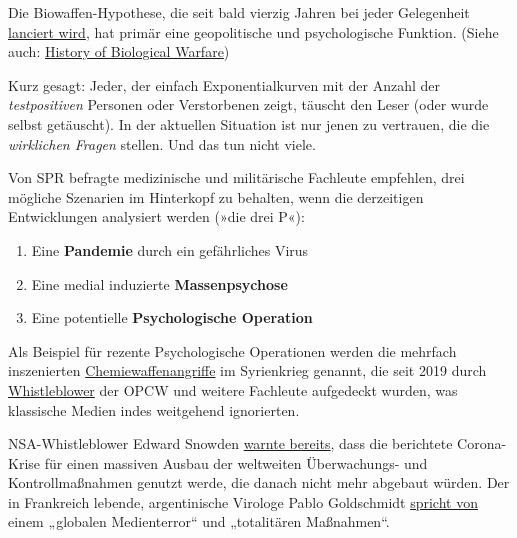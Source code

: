 Die Biowaffen-Hypothese, die seit bald vierzig Jahren bei jeder
Gelegenheit
\href{https://www.wilsoncenter.org/blog-post/operation-denver-kgb-and-stasi-disinformation-regarding-aids}{lanciert
wird}, hat primär eine geopolitische und psychologische Funktion. (Siehe
auch:
\href{https://www.emedicinehealth.com/biological_warfare/article_em.htm}{History
of Biological Warfare})

Kurz gesagt: Jeder, der einfach Exponentialkurven mit der Anzahl der
\emph{testpositiven} Personen oder Verstorbenen zeigt, täuscht den Leser
(oder wurde selbst getäuscht). In der aktuellen Situation ist nur jenen
zu vertrauen, die die \emph{wirklichen Fragen} stellen. Und das tun
nicht viele.

Von SPR befragte medizinische und militärische Fachleute empfehlen, drei
mögliche Szenarien im Hinterkopf zu behalten, wenn die derzeitigen
Entwicklungen analysiert werden (»die drei P«):

\begin{enumerate}
\def\labelenumi{\arabic{enumi}.}
\tightlist
\item
  Eine \textbf{Pandemie} durch ein gefährliches Virus
\item
  Eine medial induzierte \textbf{Massenpsychose}
\item
  Eine potentielle \textbf{Psychologische Operation}
\end{enumerate}

Als Beispiel für rezente Psychologische Operationen werden die mehrfach
inszenierten
\href{https://www.globalresearch.ca/the-bbc-saving-syrias-children-documentary-staged-events-fake-video-footage/5470158}{Chemie­waffen­angriffe}
im Syrienkrieg genannt, die seit 2019 durch
\href{https://thegrayzone.com/2020/01/22/ian-henderson-opcw-whistleblower-un-no-chemical-attack-douma-syria/}{Whistleblower}
der OPCW und weitere Fachleute aufgedeckt wurden, was klassische Medien
indes weitgehend ignorierten.

NSA-Whistleblower Edward Snowden
\href{https://www.futurezone.de/digital-life/article228779795/Gefaehrliche-weltweite-Entwicklung-Edward-Snowden-warnt-vor-Ueberwachung.html}{warnte
bereits}, dass die berichtete Corona-Krise für einen massiven Ausbau der
weltweiten Überwachungs- und Kontrollmaßnahmen genutzt werde, die danach
nicht mehr abgebaut würden. Der in Frankreich lebende, argentinische
Virologe Pablo Goldschmidt
\href{https://www.infobae.com/coronavirus/2020/03/28/para-un-prestigioso-cientifico-argentino-el-coronavirus-no-merece-que-el-planeta-este-en-un-estado-de-parate-total/}{spricht
von} einem „globalen Medienterror`` und „totalitären Maßnahmen``.

